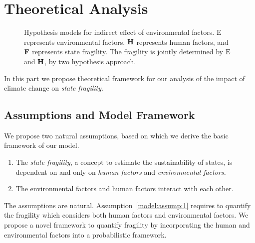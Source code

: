 \section{Theoretical Analysis}
\begin{figure}[t]
   \centering
   \caption{Hypothesis models for indirect effect of environmental factors. $\operatorname*{E}$ represents environmental factors, $\operatorname*{\mathbf{H}}$ represents human factors, and $\operatorname*{\mathbf{F}}$ represents state fragility. The fragility is jointly determined by $\operatorname*{E}$ and $\operatorname*{\mathbf{H}}$, by two hypothesis approach.}
\end{figure}
\label{sec:model}
In this part we propose theoretical framework for our analysis of the impact of climate change on \emph{state fragility}.
\subsection{Assumptions and Model Framework}
We propose two natural assumptions, based on which we derive the basic framework of our model. 
\begin{enumerate}
   \item The \emph{state fragility}, a concept to estimate the sustainability of states, is dependent on and only on \emph{human factors} and \emph{environmental factors.} \label{model:assump:1}
   \item The environmental factors and human factors interact with each other. \label{model:assump:2}
\end{enumerate}
The assumptions are natural. Assumption~\ref{model:assump:1} requires to quantify the fragility which considers both human factors and environmental factors. We propose a novel framework to quantify fragility by incorporating the human and environmental factors into a probabilistic framework.

